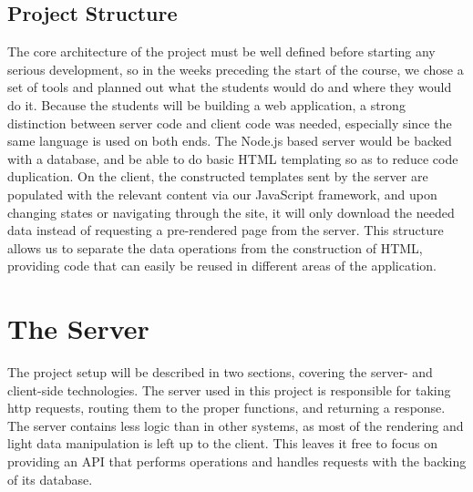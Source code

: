 \documentclass[12pt]{article}
\newcommand{\comment}[1]{{\bf \tt  {#1}}}
\newcommand{\emcomment}[1]{\textcolor{ForestGreen}{\comment{Elena: {#1}}}}
\begin{document}
\subsection{Project Structure}\label{sec:structure}
The core architecture of the project must be well defined before starting any serious development, so in the weeks preceding the start of the course, we chose a set of tools and planned out what the students would do and where they would do it. Because the students will be building a web application, a strong distinction between server code and client code was needed, especially since the same language is used on both ends. The Node.js based server would be backed with a database, and be able to do basic HTML templating so as to reduce code duplication. On the client, the constructed templates sent by the server are populated with the relevant content via our JavaScript framework, and upon changing states or navigating through the site, it will only download the needed data instead of requesting a pre-rendered page from the server. This structure allows us to separate the data operations from the construction of HTML, providing code that can easily be reused in different areas of the application.

\section{The Server}\label{sec:server}
The project setup will be described in two sections, covering the server- and client-side technologies. The server used in this project is responsible for taking http requests, routing them to the proper functions, and returning a response. The server contains less logic than in other systems, as most of the rendering and light data manipulation is left up to the client. This leaves it free to focus on providing an API that performs operations and handles requests with the backing of its database.


\end{document}
